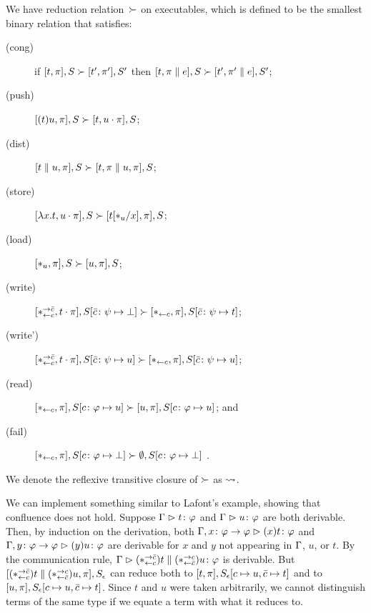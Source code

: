 We have reduction relation~$\succ$ on executables,
which is defined to be the smallest binary relation
that satisfies:
\begin{description}
 \item[(cong)] if
	    $[t,\pi],         S \succ [ t',\pi'],        S'$
	    then
	    $[t,\pi \parallel e], S \succ [ t',\pi'\parallel e], S'$\enspace;
 \item[(push)]
	    $[(t)u,\pi],S       \succ [t,u\cdot\pi],S$;
 \item[(dist)]
	    $[t\parallel u,\pi],S   \succ [t,\pi\parallel u,\pi],S$\enspace;
 \item[(store)]
	    $[\lambda x.t,u\cdot\pi],S
	     \succ
	     [t[\ast_u/x],      \pi],S$\enspace;
 \item[(load)]
	    $[\ast_u,\pi],S\succ[u,\pi],S$\enspace;
 \item[(write)]
	    $
	    [\ast^{\rightarrow {\bar{c}}}_{\leftarrow{c}}, t\cdot\pi], S[\bar{c}\colon\psi\mapsto\bot]
	    \succ
	    [\ast_{\leftarrow{c}}, \pi],
	    S[\bar{c}\colon\psi\mapsto t]
	    $\enspace;
 \item[(write')]
	    $
	    [\ast^{\rightarrow {\bar{c}}}_{\leftarrow{c}}, t\cdot\pi], S[\bar{c}\colon\psi\mapsto u]
	    \succ
	    [\ast_{\leftarrow{c}}, \pi],
	    S[\bar{c}\colon\psi\mapsto u]
	    $\enspace;
 \item[(read)]$
	    [\ast_{\leftarrow{c}} ,\pi],
	    S[c\colon\varphi\mapsto u]
	    \succ
	    [u,\pi],
	    S[c\colon\varphi\mapsto u]
	    $\enspace; and
 \item[(fail)]
	    $
	    [\ast_{\leftarrow{c}},\pi],
	    S[c\colon\varphi\mapsto \bot]
	    \succ
	    \emptyset,S[c\colon\varphi\mapsto \bot]
	    $
	    \enspace.
\end{description}
We denote the reflexive transitive closure of $\succ$ as $\rightsquigarrow$.


We can implement something similar to Lafont's example,
showing that confluence does not hold.
Suppose $\Gamma\vartriangleright{t} \colon{\varphi}$ and $\Gamma\vartriangleright{u} \colon{\varphi}$ are both derivable.
Then, by induction on the derivation,
both $\Gamma,{x} \colon{\varphi\rightarrow\varphi}\vartriangleright{(x)t} \colon{\varphi}$
and $\Gamma,{y} \colon{\varphi\rightarrow\varphi}\vartriangleright{(y)u} \colon{\varphi}$ are derivable
for $x$ and $y$ not appearing in $\Gamma$, $u$, or $t$.
By the communication rule,
$\Gamma\vartriangleright{(\ast^{\rightarrow {\bar{c}}}_{\leftarrow{c}})t\parallel(\ast^{\rightarrow {c}}_{\leftarrow{\bar{c}}})u} \colon{\varphi}$ is derivable.
But $[(\ast^{\rightarrow {\bar{c}}}_{\leftarrow{c}})t\parallel (\ast^{\rightarrow {c}}_{\leftarrow{\bar{c}}})u,
\pi],S_\epsilon$
can reduce both to $[t,\pi], S_\epsilon[c\mapsto u, \bar{c}\mapsto t]$
and to $[u,\pi], S_\epsilon[c\mapsto u,\bar{c}\mapsto t]$.
Since $t$ and $u$ were taken arbitrarily, we cannot distinguish terms
of the same type if we equate a term with what it reduces to.


